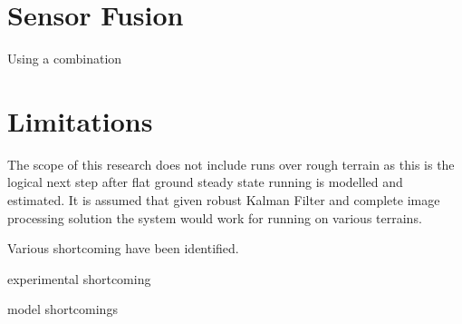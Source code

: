 \section{Sensor Fusion}
Using a combination 

\section{Limitations}
The scope of this research does not include runs over rough terrain as this is the logical next step after flat ground steady state running is modelled and estimated. It is assumed that given robust Kalman Filter and complete image processing solution the system would work for running on various terrains.

Various shortcoming have been identified.

experimental shortcoming

model shortcomings







 



















